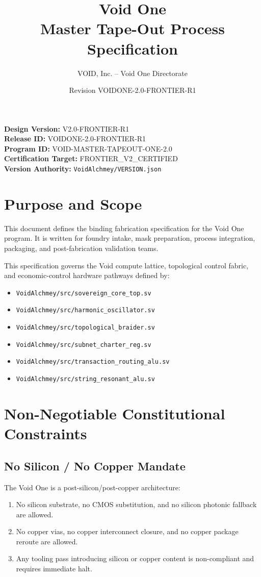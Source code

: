 \documentclass[11pt]{article}
\title{Void One\\Master Tape-Out Process Specification}
\author{VOID, Inc. -- Void One Directorate}
\date{Revision VOIDONE-2.0-FRONTIER-R1}
\begin{document}
\maketitle
\noindent\textbf{Design Version:} V2.0-FRONTIER-R1 \\
\textbf{Release ID:} VOIDONE-2.0-FRONTIER-R1 \\
\textbf{Program ID:} VOID-MASTER-TAPEOUT-ONE-2.0 \\
\textbf{Certification Target:} FRONTIER\_V2\_CERTIFIED \\
\textbf{Version Authority:} \texttt{VoidAlchmey/VERSION.json}

\tableofcontents
\newpage

\section{Purpose and Scope}
This document defines the binding fabrication specification for the Void One
program. It is written for foundry intake, mask preparation, process integration, packaging, and
post-fabrication validation teams.

This specification governs the Void compute lattice, topological control fabric, and economic-control
hardware pathways defined by:
\begin{itemize}
  \item \texttt{VoidAlchmey/src/sovereign\_core\_top.sv}
  \item \texttt{VoidAlchmey/src/harmonic\_oscillator.sv}
  \item \texttt{VoidAlchmey/src/topological\_braider.sv}
  \item \texttt{VoidAlchmey/src/subnet\_charter\_reg.sv}
  \item \texttt{VoidAlchmey/src/transaction\_routing\_alu.sv}
  \item \texttt{VoidAlchmey/src/string\_resonant\_alu.sv}
\end{itemize}

\section{Non-Negotiable Constitutional Constraints}
\subsection{No Silicon / No Copper Mandate}
The Void One is a post-silicon/post-copper architecture:
\begin{enumerate}
  \item No silicon substrate, no CMOS substitution, and no silicon photonic fallback are allowed.
  \item No copper vias, no copper interconnect closure, and no copper package reroute are allowed.
  \item Any tooling pass introducing silicon or copper content is non-compliant and requires immediate halt.
\end{enumerate}
\end{document}
